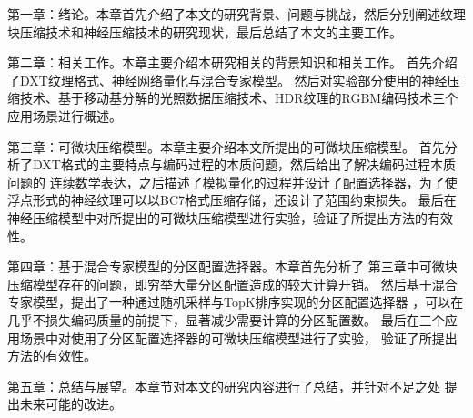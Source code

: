 第一章：绪论。本章首先介绍了本文的研究背景、问题与挑战，然后分别阐述纹理
块压缩技术和神经压缩技术的研究现状，最后总结了本文的主要工作。

第二章：相关工作。本章主要介绍本研究相关的背景知识和相关工作。
首先介绍了DXT纹理格式、神经网络量化与混合专家模型。
然后对实验部分使用的神经压缩技术、基于移动基分解的光照数据压缩技术、HDR纹理的RGBM编码技术三个应用场景进行概述。

第三章：可微块压缩模型。本章主要介绍本文所提出的可微块压缩模型。
首先分析了DXT格式的主要特点与编码过程的本质问题，然后给出了解决编码过程本质问题的
连续数学表达，之后描述了模拟量化的过程并设计了配置选择器，为了使
浮点形式的神经纹理可以以BC7格式压缩存储，还设计了范围约束损失。
最后在神经压缩模型中对所提出的可微块压缩模型进行实验，验证了所提出方法的有效性。

第四章：基于混合专家模型的分区配置选择器。本章首先分析了
第三章中可微块压缩模型存在的问题，即穷举大量分区配置造成的较大计算开销。
然后基于混合专家模型，提出了一种通过随机采样与TopK排序实现的分区配置选择器
，可以在几乎不损失编码质量的前提下，显著减少需要计算的分区配置数。
最后在三个应用场景中对使用了分区配置选择器的可微块压缩模型进行了实验，
验证了所提出方法的有效性。

第五章：总结与展望。本章节对本文的研究内容进行了总结，并针对不足之处
提出未来可能的改进。

